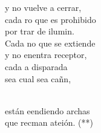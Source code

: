 \begin{cancion}
	y no  vuelve a cerrar,\\
	cada ro que es prohibido \\
	por trar de ilumin.\\
	Cada no que se extiende \\
	y no enentra receptor,\\
	cada a disparada \\
	sea cual sea  cañn,  \\\jump\\
	\begin{chorus}%
	están eendiendo archas\\
	que recman ateión. (**)\\
	\end{chorus}%
	\jump\\
\end{cancion}%
